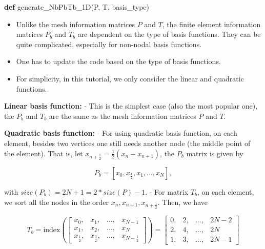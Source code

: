 \documentclass[11pt]{article}
\providecommand{\tightlist}{%
      \setlength{\itemsep}{0pt}\setlength{\parskip}{0pt}}
\newenvironment{Shaded}{}{}
\newcommand{\KeywordTok}[1]{\textcolor[rgb]{0.00,0.44,0.13}{\textbf{{#1}}}}
\newcommand{\NormalTok}[1]{{#1}}
\begin{document}
\begin{Shaded}
\begin{Highlighting}[]
    \KeywordTok{def}\NormalTok{ generate_NbPbTb_1D(P, T, basis_type)}
\end{Highlighting}
\end{Shaded}

\begin{itemize}
\tightlist
\item
  Unlike the mesh information matrices \(P\) and \(T\), the finite
  element information matrices \(P_b\) and \(T_b\) are dependent on the
  type of basis functions. They can be quite complicated, especially for
  non-nodal basis functions.
\item
  One has to update the code based on the type of basis functions.
\item
  For simplicity, in this tutorial, we only consider the linear and
  quadratic functions.
\end{itemize}

\textbf{Linear basis function:} - This is the simplest case (also the
most popular one), the \(P_b\) and \(T_b\) are the same as the mesh
information matrices \(P\) and \(T\).

    \textbf{Quadratic basis function:} - For using quadratic basis function,
on each element, besides two vertices one still needs another node (the
middle point of the element). That is, let
\(x_{n+\frac{1}{2}} = \frac{1}{2}\left(x_n + x_{n+1}\right)\), the
\(P_b\) matrix is given by

\begin{equation} 
    P_b = [x_0, x_{\frac{1}{2}}, x_1, \ldots, x_N],
\end{equation}

with \(size(P_b) = 2N+1 = 2*size(P)-1\). - For matrix \(T_b\), on each
element, we sort all the nodes in the order
\(x_n, x_{n+1}, x_{n+\frac{1}{2}}\). Then, we have

\begin{equation}
    T_b = \text{index}\left(\left[\begin{array}{cccc}x_0, & x_1, & \ldots, & x_{N-1}\\
                               x_1, & x_2, & \ldots, & x_N \\
                               x_{\frac{1}{2}}, & x_{\frac{3}{2}}, &\ldots, & x_{N-\frac{1}{2}}\end{array}\right]\right) = \left[\begin{array}{cccc}0, & 2, & \ldots, & 2N-2\\
                           2, & 4, & \ldots, & 2N \\ 1, & 3, &\ldots, & 2N-1\end{array}\right]
\end{equation}
\end{document}
